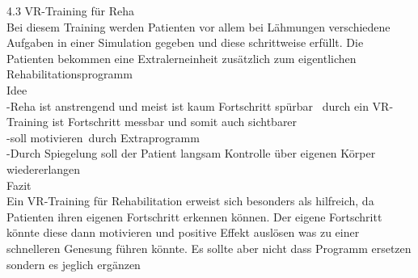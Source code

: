 4.3 VR-Training für Reha\\

Bei diesem Training werden Patienten vor allem bei Lähmungen verschiedene Aufgaben in einer Simulation gegeben und diese schrittweise erfüllt. Die Patienten bekommen eine Extralerneinheit zusätzlich zum eigentlichen Rehabilitationsprogramm\\

Idee\\
-Reha ist anstrengend und meist ist kaum Fortschritt spürbar 
durch ein VR-Training ist Fortschritt messbar und somit auch sichtbarer\\
-soll motivieren durch Extraprogramm\\
-Durch Spiegelung soll der Patient langsam Kontrolle über eigenen Körper wiedererlangen\\

Fazit\\
Ein VR-Training für Rehabilitation erweist sich besonders als hilfreich, da Patienten ihren eigenen Fortschritt erkennen können. Der eigene Fortschritt könnte diese dann motivieren und positive Effekt auslösen was zu einer schnelleren Genesung führen könnte. Es sollte aber nicht dass Programm ersetzen sondern es jeglich ergänzen



